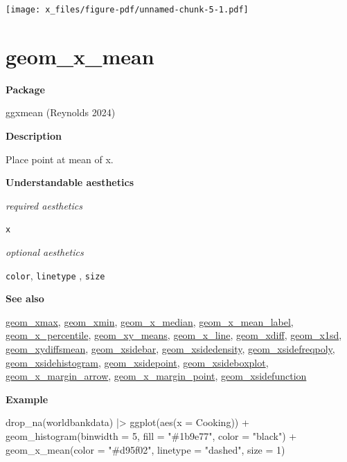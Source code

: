\documentclass[
  letterpaper,
  DIV=11,
  numbers=noendperiod]{scrreprt}
\newenvironment{Shaded}{\begin{snugshade}}{\end{snugshade}}
\newcommand{\AttributeTok}[1]{\textcolor[rgb]{0.40,0.45,0.13}{#1}}
\newcommand{\DecValTok}[1]{\textcolor[rgb]{0.68,0.00,0.00}{#1}}
\newcommand{\FunctionTok}[1]{\textcolor[rgb]{0.28,0.35,0.67}{#1}}
\newcommand{\NormalTok}[1]{\textcolor[rgb]{0.00,0.23,0.31}{#1}}
\newcommand{\SpecialCharTok}[1]{\textcolor[rgb]{0.37,0.37,0.37}{#1}}
\newcommand{\StringTok}[1]{\textcolor[rgb]{0.13,0.47,0.30}{#1}}
\begin{document}
\texttt{[image: x\_files/figure-pdf/unnamed-chunk-5-1.pdf]}

\section{geom\_x\_mean}\label{x_mean}

\textbf{Package}

ggxmean (Reynolds 2024)

\textbf{Description}

Place point at mean of x.

\textbf{Understandable aesthetics}

\emph{required aesthetics}

\texttt{x}

\emph{optional aesthetics}

\texttt{color}, \texttt{linetype} , \texttt{size}

\textbf{See also}

\href{@xmax}{geom\_xmax}, \href{@xmin}{geom\_xmin},
\href{@x_median}{geom\_x\_median},
\href{@x_mean_label}{geom\_x\_mean\_label},
\href{@x_percentile}{geom\_x\_percentile},
\href{@xy_means}{geom\_xy\_means}, \href{@x_line}{geom\_x\_line},
\href{@xdiff}{geom\_xdiff}, \href{@x1sd}{geom\_x1sd},
\href{@xydiffsmean}{geom\_xydiffsmean},
\href{@xsidebar}{geom\_xsidebar},
\href{@xsidedensity}{geom\_xsidedensity},
\href{@xsidefreqpoly}{geom\_xsidefreqpoly},
\href{@xsidehistogram}{geom\_xsidehistogram},
\href{@xsidepoint}{geom\_xsidepoint},
\href{@xsideboxplot}{geom\_xsideboxplot},
\href{@x_margin_arrow}{geom\_x\_margin\_arrow},
\href{@x_margin_point}{geom\_x\_margin\_point},
\href{@xsidefunction}{geom\_xsidefunction}

\textbf{Example}

\begin{Shaded}
\begin{Highlighting}[]
\FunctionTok{drop\_na}\NormalTok{(worldbankdata) }\SpecialCharTok{|\textgreater{}}
\FunctionTok{ggplot}\NormalTok{(}\FunctionTok{aes}\NormalTok{(}\AttributeTok{x =}\NormalTok{ Cooking)) }\SpecialCharTok{+}
  \FunctionTok{geom\_histogram}\NormalTok{(}\AttributeTok{binwidth =} \DecValTok{5}\NormalTok{, }\AttributeTok{fill =} \StringTok{"\#1b9e77"}\NormalTok{, }\AttributeTok{color =} \StringTok{"black"}\NormalTok{) }\SpecialCharTok{+} 
  \FunctionTok{geom\_x\_mean}\NormalTok{(}\AttributeTok{color =} \StringTok{"\#d95f02"}\NormalTok{, }\AttributeTok{linetype =} \StringTok{"dashed"}\NormalTok{, }\AttributeTok{size =} \DecValTok{1}\NormalTok{) }
\end{Highlighting}
\end{Shaded}
\end{document}

